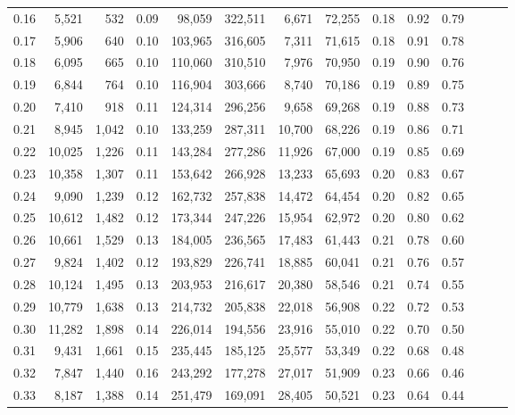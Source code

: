 \begin{tabular}{rrrrrrrrrrrrrr}
0.16 &   5,521 &    532 &  0.09 &   98,059 &  322,511 &   6,671 &  72,255 &  0.18 &  0.92 &      0.79 \\
0.17 &   5,906 &    640 &  0.10 &  103,965 &  316,605 &   7,311 &  71,615 &  0.18 &  0.91 &      0.78 \\
0.18 &   6,095 &    665 &  0.10 &  110,060 &  310,510 &   7,976 &  70,950 &  0.19 &  0.90 &      0.76 \\
0.19 &   6,844 &    764 &  0.10 &  116,904 &  303,666 &   8,740 &  70,186 &  0.19 &  0.89 &      0.75 \\
0.20 &   7,410 &    918 &  0.11 &  124,314 &  296,256 &   9,658 &  69,268 &  0.19 &  0.88 &      0.73 \\
0.21 &   8,945 &  1,042 &  0.10 &  133,259 &  287,311 &  10,700 &  68,226 &  0.19 &  0.86 &      0.71 \\
0.22 &  10,025 &  1,226 &  0.11 &  143,284 &  277,286 &  11,926 &  67,000 &  0.19 &  0.85 &      0.69 \\
0.23 &  10,358 &  1,307 &  0.11 &  153,642 &  266,928 &  13,233 &  65,693 &  0.20 &  0.83 &      0.67 \\
0.24 &   9,090 &  1,239 &  0.12 &  162,732 &  257,838 &  14,472 &  64,454 &  0.20 &  0.82 &      0.65 \\
0.25 &  10,612 &  1,482 &  0.12 &  173,344 &  247,226 &  15,954 &  62,972 &  0.20 &  0.80 &      0.62 \\
0.26 &  10,661 &  1,529 &  0.13 &  184,005 &  236,565 &  17,483 &  61,443 &  0.21 &  0.78 &      0.60 \\
0.27 &   9,824 &  1,402 &  0.12 &  193,829 &  226,741 &  18,885 &  60,041 &  0.21 &  0.76 &      0.57 \\
0.28 &  10,124 &  1,495 &  0.13 &  203,953 &  216,617 &  20,380 &  58,546 &  0.21 &  0.74 &      0.55 \\
0.29 &  10,779 &  1,638 &  0.13 &  214,732 &  205,838 &  22,018 &  56,908 &  0.22 &  0.72 &      0.53 \\
0.30 &  11,282 &  1,898 &  0.14 &  226,014 &  194,556 &  23,916 &  55,010 &  0.22 &  0.70 &      0.50 \\
0.31 &   9,431 &  1,661 &  0.15 &  235,445 &  185,125 &  25,577 &  53,349 &  0.22 &  0.68 &      0.48 \\
0.32 &   7,847 &  1,440 &  0.16 &  243,292 &  177,278 &  27,017 &  51,909 &  0.23 &  0.66 &      0.46 \\
0.33 &   8,187 &  1,388 &  0.14 &  251,479 &  169,091 &  28,405 &  50,521 &  0.23 &  0.64 &      0.44 \\

\end{tabular}
